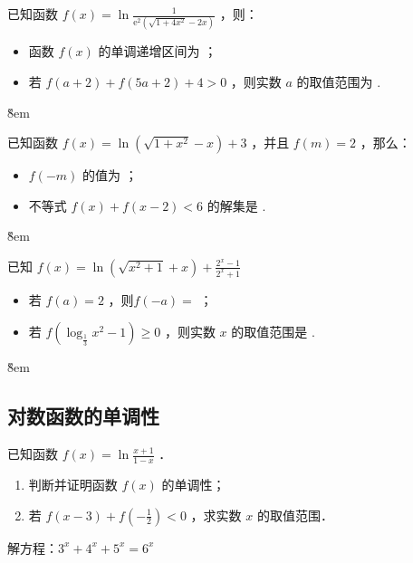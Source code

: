 \begin{example}
    已知函数 $f(x)=\ln \frac{1}{\mathrm{e}^2\left(\sqrt{1+4 x^2}-2 x\right)}$ ，则：
    \begin{itemize}
        \item 函数 $f(x)$ 的单调递增区间为 \underline{\qquad} ；
        \item 若 $f(a+2)+f(5 a+2)+4>0$ ，则实数 $a$ 的取值范围为 \underline{\qquad}.
    \end{itemize}
\end{example}

\v{8em}

\begin{example}
    已知函数 $f(x)=\ln \left(\sqrt{1+x^2}-x\right)+3$ ，并且 $f(m)=2$ ，那么：
    \begin{itemize}
        \item $f(-m)$ 的值为 \underline{\qquad}；
        \item 不等式 $f(x)+f(x-2)<6$ 的解集是 \underline{\qquad}.
    \end{itemize}
\end{example}

\v{8em}

\begin{example}
    已知 $f(x)=\ln \left(\sqrt{x^2+1}+x\right)+\frac{2^x-1}{2^x+1}$
    \begin{itemize}
        \item 若 $f(a)=2$ ，则$f(-a)=$ \underline{\qquad}；
        \item 若 $f\left(\log _{\frac{1}{3}} x^2-1\right) \geq 0$ ，则实数 $x$ 的取值范围是 \underline{\qquad}.
    \end{itemize}
\end{example}

\v{8em}

\subsection{对数函数的单调性}

\begin{example}
    已知函数 $f(x)=\ln \frac{x+1}{1-x}$ ．
    \begin{enumerate}
        \item 判断并证明函数 $f(x)$ 的单调性；

        \item 若 $f(x-3)+f\left(-\frac{1}{2}\right)<0$ ，求实数 $x$ 的取值范围．
    \end{enumerate}
\end{example}

\begin{problemset}
    \item 解方程：$3^x+4^x+5^x = 6^x$
\end{problemset}